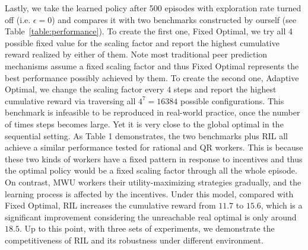 %

%

Lastly, we take the learned policy after 500 episodes with exploration rate turned off (i.e. $\epsilon =0$) and compares it with two benchmarks constructed by ourself (see Table~\ref{table:performance}). To create the first one, Fixed Optimal, we try all 4 possible fixed value for the scaling factor and report the highest cumulative reward realized by either of them. Note most traditional peer prediction mechanisms assume a fixed scaling factor and thus Fixed Optimal represents the best performance possibly achieved by them.
To create the second one, Adaptive Optimal, we change the scaling factor every $4$ steps and report the highest cumulative reward via traversing all $4^7=16384$ possible configurations. This benchmark is infeasible to be reproduced in real-world practice, once the number of times steps becomes large. Yet it is very close to the global optimal in the sequential setting.
As Table 1 demonstrates, the two benchmarks plus RIL all achieve a similar performance tested for rational and QR workers.
This is because these two kinds of workers have a fixed pattern in response to incentives and thus the optimal policy would be a fixed scaling factor through all the whole episode.
On contrast, MWU workers their utility-maximizing strategies gradually, and the learning process is affected by the incentives. Under this model, compared with Fixed Optimal, RIL increases the cumulative reward from $11.7$ to $15.6$, which is a significant improvement considering the unreachable real optimal is only around $18.5$. Up to this point, with three sets of experiments, we demonstrate the competitiveness of RIL and its robustness under different environment.%

